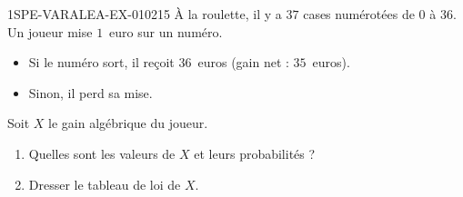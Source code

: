 \begin{exercice}{1SPE-VARALEA-EX-010}{2}{15}
À la roulette, il y a $37$ cases numérotées de $0$ à $36$. Un joueur mise $1$~euro sur un numéro.
\begin{itemize}
  \item Si le numéro sort, il reçoit $36$~euros (gain net : $35$~euros).
  \item Sinon, il perd sa mise.
\end{itemize}
Soit $X$ le gain algébrique du joueur.

\begin{enumerate}
  \item Quelles sont les valeurs de $X$ et leurs probabilités ?
  \item Dresser le tableau de loi de $X$.
\end{enumerate}
\end{exercice}
